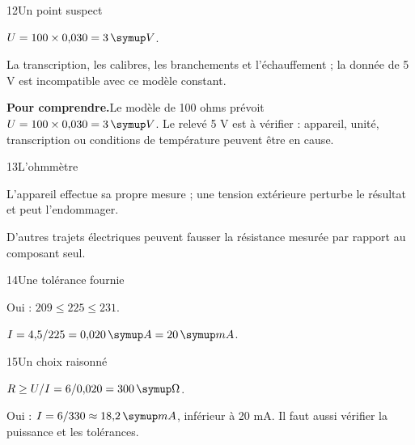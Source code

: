 \par\noindent\begin{minipage}{\linewidth}
\begin{corrige}{12}{Un point suspect}
\begin{questions}
\item $U=100\times0{,}030=3\unite V$.
\item La transcription, les calibres, les branchements et l’échauffement ; la donnée de 5 V est incompatible avec ce modèle constant.
\end{questions}
\par\smallskip\noindent\textbf{Pour comprendre.}\enspace Le modèle de 100 ohms prévoit $U=100\times0{,}030=3\unite V$. Le relevé 5 V est à vérifier : appareil, unité, transcription ou conditions de température peuvent être en cause.\par
{}
\end{corrige}
\end{minipage}
\par\noindent\begin{minipage}{\linewidth}
\begin{corrige}{13}{L’ohmmètre}
\begin{questions}
\item L’appareil effectue sa propre mesure ; une tension extérieure perturbe le résultat et peut l’endommager.
\item D’autres trajets électriques peuvent fausser la résistance mesurée par rapport au composant seul.
\end{questions}
\end{corrige}
\end{minipage}
\par\noindent\begin{minipage}{\linewidth}
\begin{corrige}{14}{Une tolérance fournie}
\begin{questions}
\item Oui : $209\leq225\leq231$.
\item $I=4{,}5/225=0{,}020\unite A=20\unite{mA}$.
\end{questions}
\end{corrige}
\end{minipage}
\par\noindent\begin{minipage}{\linewidth}
\begin{corrige}{15}{Un choix raisonné}
\begin{questions}
\item $R\geq U/I=6/0{,}020=300\unite\Omega$.
\item Oui : $I=6/330\approx18{,}2\unite{mA}$, inférieur à 20 mA. Il faut aussi vérifier la puissance et les tolérances.
\end{questions}
\end{corrige}
\end{minipage}
